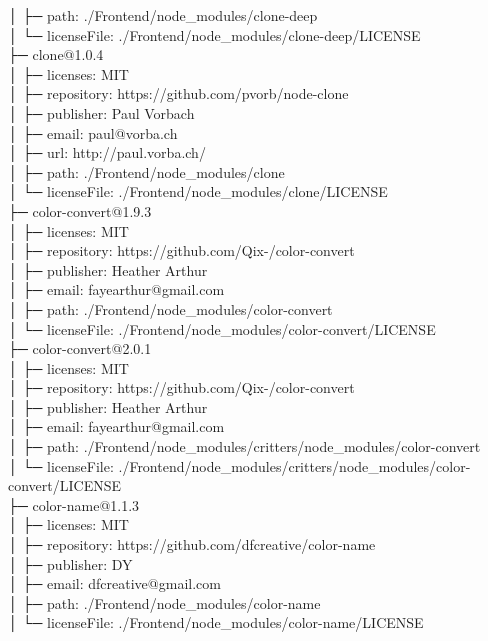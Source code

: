 \documentclass[
    paper=a4,
    twoside=false,
    parskip=half,
    listof=entryprefix,
    listof=totoc,
    index=totoc,
    bibliography=totoc,
    headsepline,
]{scrbook}
\begin{document}
    │  ├─ path: ./Frontend/node\_modules/clone-deep\\
    │  └─ licenseFile: ./Frontend/node\_modules/clone-deep/LICENSE\\
    ├─ clone@1.0.4\\
    │  ├─ licenses: MIT\\
    │  ├─ repository: https://github.com/pvorb/node-clone\\
    │  ├─ publisher: Paul Vorbach\\
    │  ├─ email: paul@vorba.ch\\
    │  ├─ url: http://paul.vorba.ch/\\
    │  ├─ path: ./Frontend/node\_modules/clone\\
    │  └─ licenseFile: ./Frontend/node\_modules/clone/LICENSE\\
    ├─ color-convert@1.9.3\\
    │  ├─ licenses: MIT\\
    │  ├─ repository: https://github.com/Qix-/color-convert\\
    │  ├─ publisher: Heather Arthur\\
    │  ├─ email: fayearthur@gmail.com\\
    │  ├─ path: ./Frontend/node\_modules/color-convert\\
    │  └─ licenseFile: ./Frontend/node\_modules/color-convert/LICENSE\\
    ├─ color-convert@2.0.1\\
    │  ├─ licenses: MIT\\
    │  ├─ repository: https://github.com/Qix-/color-convert\\
    │  ├─ publisher: Heather Arthur\\
    │  ├─ email: fayearthur@gmail.com\\
    │  ├─ path: ./Frontend/node\_modules/critters/node\_modules/color-convert\\
    │  └─ licenseFile: ./Frontend/node\_modules/critters/node\_modules/color-convert/LICENSE\\
    ├─ color-name@1.1.3\\
    │  ├─ licenses: MIT\\
    │  ├─ repository: https://github.com/dfcreative/color-name\\
    │  ├─ publisher: DY\\
    │  ├─ email: dfcreative@gmail.com\\
    │  ├─ path: ./Frontend/node\_modules/color-name\\
    │  └─ licenseFile: ./Frontend/node\_modules/color-name/LICENSE\\
\end{document}
